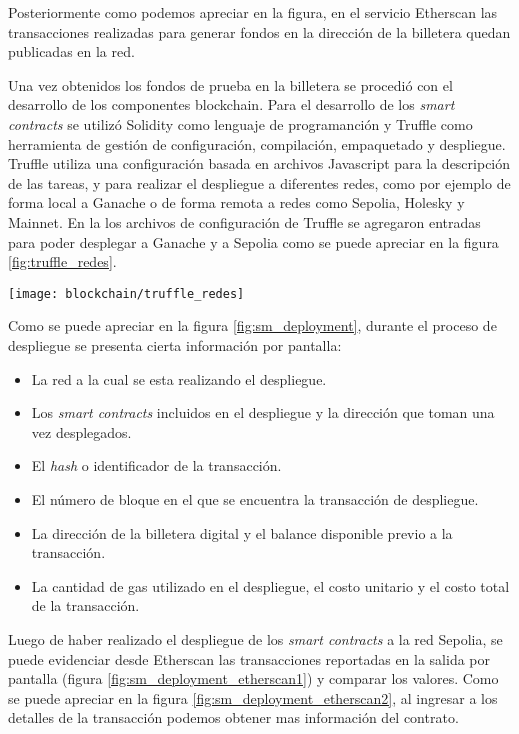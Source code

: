 Posteriormente como podemos apreciar en la figura, en el servicio Etherscan las transacciones realizadas para generar fondos en la dirección de la billetera quedan publicadas en la red.



Una vez obtenidos los fondos de prueba en la billetera se procedió con el desarrollo de los componentes blockchain. Para el desarrollo de los \textit{smart contracts} se utilizó Solidity como lenguaje de programanción y Truffle como herramienta de gestión de configuración, compilación, empaquetado y despliegue. Truffle utiliza una configuración basada en archivos Javascript para la descripción de las tareas, y para realizar el despliegue a diferentes redes, como por ejemplo de forma local a Ganache o de forma remota a redes como Sepolia, Holesky y Mainnet. En la los archivos de configuración de Truffle se agregaron entradas para poder desplegar a Ganache y a Sepolia como se puede apreciar en la figura \ref{fig:truffle_redes}.

\begin{center}
   \texttt{[image: blockchain/truffle\_redes]}
   \label{fig:truffle_redes}
\end{center}

Como se puede apreciar en la figura \ref{fig:sm_deployment}, durante el proceso de despliegue se presenta cierta información por pantalla:

\begin{itemize}
	\item La red a la cual se esta realizando el despliegue.
	\item Los \textit{smart contracts} incluidos en el despliegue y la dirección que toman una vez desplegados. 
	\item El \textit{hash} o identificador de la transacción.
	\item El número de bloque en el que se encuentra la transacción de despliegue.
	\item La dirección de la billetera digital y el balance disponible previo a la transacción.
	\item La cantidad de gas utilizado en el despliegue, el costo unitario y el costo total de la transacción.
\end{itemize}

Luego de haber realizado el despliegue de los \textit{smart contracts} a la red Sepolia, se puede evidenciar desde Etherscan las transacciones reportadas en la salida por pantalla (figura \ref{fig:sm_deployment_etherscan1}) y comparar los valores. Como se puede apreciar en la figura \ref{fig:sm_deployment_etherscan2}, al ingresar a los detalles de la transacción podemos obtener mas información del contrato.


